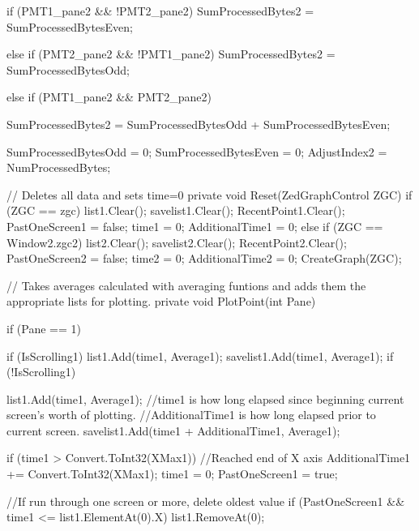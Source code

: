 {{{            if (PMT1_pane2 && !PMT2_pane2)
            {
                SumProcessedBytes2 = SumProcessedBytesEven;
            }

            else if (PMT2_pane2 && !PMT1_pane2)
            {
                SumProcessedBytes2 = SumProcessedBytesOdd;
            }

            else if (PMT1_pane2 && PMT2_pane2)
            {
                SumProcessedBytes2 = SumProcessedBytesOdd + SumProcessedBytesEven;

            }

            SumProcessedBytesOdd = 0;
            SumProcessedBytesEven = 0;
            AdjustIndex2 = NumProcessedBytes;
        }


        // Deletes all data and sets time=0
        private void Reset(ZedGraphControl ZGC)
        {
            if (ZGC == zgc)
            {
                list1.Clear();
                savelist1.Clear();
                RecentPoint1.Clear();
                PastOneScreen1 = false;
                time1 = 0;
                AdditionalTime1 = 0;
            }
            else if (ZGC == Window2.zgc2)
            {
                list2.Clear();
                savelist2.Clear();
                RecentPoint2.Clear();
                PastOneScreen2 = false;
                time2 = 0;
                AdditionalTime2 = 0;
            }
            CreateGraph(ZGC);
        }

        // Takes averages calculated with averaging funtions and adds them the appropriate lists for plotting.
        private void PlotPoint(int Pane)
        {
            if (Pane == 1)
            {
                if (IsScrolling1)
                {
                    list1.Add(time1, Average1);
                    savelist1.Add(time1, Average1);
                }
                if (!IsScrolling1)
                {
                    list1.Add(time1, Average1);
                    //time1 is how long elapsed since beginning current screen's worth of plotting.
                    //AdditionalTime1 is how long elapsed prior to current screen.
                    savelist1.Add(time1 + AdditionalTime1, Average1); 
                    
                    if (time1 > Convert.ToInt32(XMax1)) //Reached end of X axis
                    {
                        AdditionalTime1 += Convert.ToInt32(XMax1);
                        time1 = 0;
                        PastOneScreen1 = true;
                    }

                    //If run through one screen or more, delete oldest value
                    if (PastOneScreen1 && time1 <= list1.ElementAt(0).X)
                    {
                        list1.RemoveAt(0);
                    }

}}}}}
